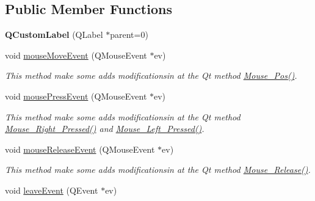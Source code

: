 \subsection*{Public Member Functions}
\begin{DoxyCompactItemize}
\item 
\hypertarget{classQCustomLabel_a15eca432ecab522f162c87374ac6bca6}{{\bfseries Q\-Custom\-Label} (Q\-Label $\ast$parent=0)}\label{classQCustomLabel_a15eca432ecab522f162c87374ac6bca6}

\item 
\hypertarget{classQCustomLabel_a834a064e119add6ffb0ff1ea5ce78d7e}{void \hyperlink{classQCustomLabel_a834a064e119add6ffb0ff1ea5ce78d7e}{mouse\-Move\-Event} (Q\-Mouse\-Event $\ast$ev)}\label{classQCustomLabel_a834a064e119add6ffb0ff1ea5ce78d7e}

\begin{DoxyCompactList}\small\item\em This method make some adds modificationsin at the Qt method \hyperlink{classQCustomLabel_a45deee93a6a40df2979492a2ff680c88}{Mouse\-\_\-\-Pos()}. \end{DoxyCompactList}\item 
\hypertarget{classQCustomLabel_a971a01e5c52150d2874555c5d6b11807}{void \hyperlink{classQCustomLabel_a971a01e5c52150d2874555c5d6b11807}{mouse\-Press\-Event} (Q\-Mouse\-Event $\ast$ev)}\label{classQCustomLabel_a971a01e5c52150d2874555c5d6b11807}

\begin{DoxyCompactList}\small\item\em This method make some adds modificationsin at the Qt method \hyperlink{classQCustomLabel_a221ee1658fe8b86dbcc9036e7b740ab8}{Mouse\-\_\-\-Right\-\_\-\-Pressed()} and \hyperlink{classQCustomLabel_a6c990d236a4ff2e2898a3e84cd130f9b}{Mouse\-\_\-\-Left\-\_\-\-Pressed()}. \end{DoxyCompactList}\item 
\hypertarget{classQCustomLabel_ab88c55fd49219104cfabe91ed68aa496}{void \hyperlink{classQCustomLabel_ab88c55fd49219104cfabe91ed68aa496}{mouse\-Release\-Event} (Q\-Mouse\-Event $\ast$ev)}\label{classQCustomLabel_ab88c55fd49219104cfabe91ed68aa496}

\begin{DoxyCompactList}\small\item\em This method make some adds modificationsin at the Qt method \hyperlink{classQCustomLabel_a1725399a11e80f0c79f3d1c63cf505ef}{Mouse\-\_\-\-Release()}. \end{DoxyCompactList}\item 
\hypertarget{classQCustomLabel_a99b5c445f092757d5f1e59c6aee6fb88}{void \hyperlink{classQCustomLabel_a99b5c445f092757d5f1e59c6aee6fb88}{leave\-Event} (Q\-Event $\ast$ev)}\label{classQCustomLabel_a99b5c445f092757d5f1e59c6aee6fb88}


\end{DoxyCompactItemize}
